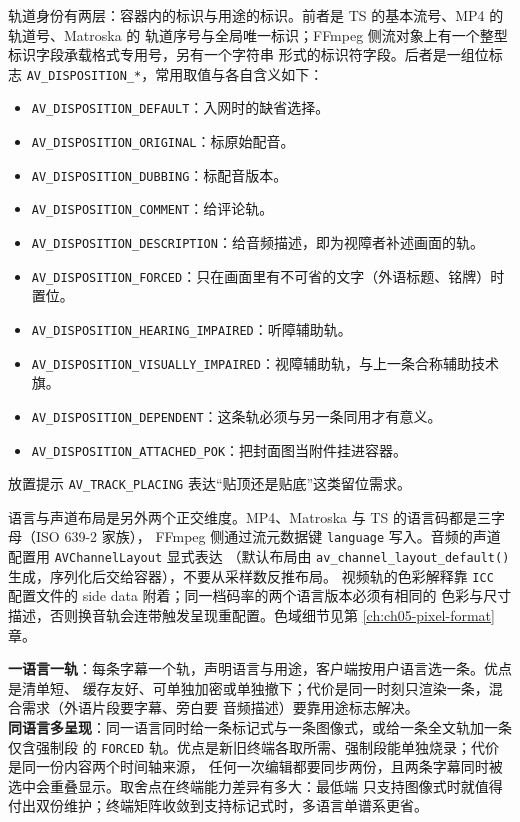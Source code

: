 \documentclass[12pt,a4paper,fontset=fandol]{ctexbook}
\newcommand{\Fn}[1]{\texttt{#1()}}
\newcommand{\Tp}[1]{\texttt{#1}}
\newcommand{\Bk}{\discretionary{}{}{}}
\begin{document}
轨道身份有两层：容器内的标识与用途的标识。前者是 TS 的基本流号、MP4 的轨道号、Matroska 的
轨道序号与全局唯一标识；FFmpeg 侧流对象上有一个整型标识字段承载格式专用号，另有一个字符串
形式的标识符字段。后者是一组位标志 \Tp{AV\_{\Bk}DISPOSITION\_{\Bk}*}，常用取值与各自含义如下：
\begin{itemize}
  \item \Tp{AV\_{\Bk}DISPOSITION\_{\Bk}DEFAULT}：入网时的缺省选择。
  \item \Tp{AV\_{\Bk}DISPOSITION\_{\Bk}ORIGINAL}：标原始配音。
  \item \Tp{AV\_{\Bk}DISPOSITION\_{\Bk}DUBBING}：标配音版本。
  \item \Tp{AV\_{\Bk}DISPOSITION\_{\Bk}COMMENT}：给评论轨。
  \item \Tp{AV\_{\Bk}DISPOSITION\_{\Bk}DESCRIPTION}：给音频描述，即为视障者补述画面的轨。
  \item \Tp{AV\_{\Bk}DISPOSITION\_{\Bk}FORCED}：只在画面里有不可省的文字（外语标题、铭牌）时置位。
  \item \Tp{AV\_{\Bk}DISPOSITION\_{\Bk}HEARING\_{\Bk}IMPAIRED}：听障辅助轨。
  \item \Tp{AV\_{\Bk}DISPOSITION\_{\Bk}VISUALLY\_{\Bk}IMPAIRED}：视障辅助轨，与上一条合称辅助技术旗。
  \item \Tp{AV\_{\Bk}DISPOSITION\_{\Bk}DEPENDENT}：这条轨必须与另一条同用才有意义。
  \item \Tp{AV\_{\Bk}DISPOSITION\_{\Bk}ATTACHED\_{\Bk}POK}：把封面图当附件挂进容器。
\end{itemize}
放置提示 \Tp{AV\_{\Bk}TRACK\_{\Bk}PLACING} 表达``贴顶还是贴底''这类留位需求。

语言与声道布局是另外两个正交维度。MP4、Matroska 与 TS 的语言码都是三字母（ISO 639-2 家族），
FFmpeg 侧通过流元数据键 \Tp{language} 写入。音频的声道配置用 \Tp{AVChannelLayout} 显式表达
（默认布局由 \Fn{av\_channel\_layout\_default} 生成，序列化后交给容器），不要从采样数反推布局。
视频轨的色彩解释靠 \Tp{ICC} 配置文件的 side data 附着；同一档码率的两个语言版本必须有相同的
色彩与尺寸描述，否则换音轨会连带触发呈现重配置。色域细节见第 \ref{ch:ch05-pixel-format} 章。

\begin{compare}[title={多语言字幕与同语言多呈现}]
\textbf{一语言一轨}：每条字幕一个轨，声明语言与用途，客户端按用户语言选一条。优点是清单短、
缓存友好、可单独加密或单独撤下；代价是同一时刻只渲染一条，混合需求（外语片段要字幕、旁白要
音频描述）要靠用途标志解决。\\
\textbf{同语言多呈现}：同一语言同时给一条标记式与一条图像式，或给一条全文轨加一条仅含强制段
的 \Tp{FORCED} 轨。优点是新旧终端各取所需、强制段能单独烧录；代价是同一份内容两个时间轴来源，
任何一次编辑都要同步两份，且两条字幕同时被选中会重叠显示。取舍点在终端能力差异有多大：最低端
只支持图像式时就值得付出双份维护；终端矩阵收敛到支持标记式时，多语言单谱系更省。
\end{compare}
\end{document}
